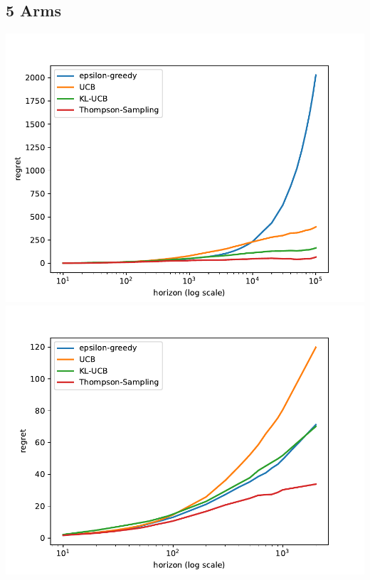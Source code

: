 \documentclass[11pt]{article}
\begin{document}
\subsection{5 Arms}
\begin{center}
\includegraphics[width=15cm]{arms_5.pdf}
\includegraphics[width=15cm]{arms_5_zoom.pdf}
\end{center}
\end{document}
